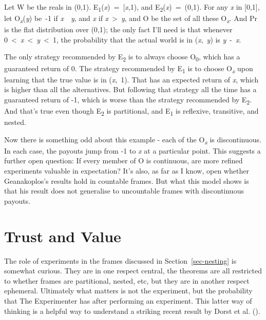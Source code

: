 \documentclass[
  11pt,
  letterpaper,
  DIV=11,
  numbers=noendperiod,
  twoside]{scrartcl}
\begin{document}
Let W be the reals in (0,1).
E\textsubscript{1}(\emph{x})~=~{[}\emph{x},1), and
E\textsubscript{2}(\emph{x})~=~(0,1). For any \emph{x} in {[}0,1{]}, let
O\textsubscript{\emph{x}}(\emph{y}) be~-1 if \emph{x}~\geq~\emph{y}, and
\emph{x} if \emph{x}~\textgreater~\emph{y}, and O be the set of all
these O\textsubscript{\emph{x}}. And Pr is the flat distribution over
(0,1); the only fact I'll need is that whenever
0~\textless~\emph{x}~\textless~\emph{y}~\textless~1, the probability
that the actual world is in (\emph{x},~\emph{y}) is \emph{y}~-~\emph{x}.

The only strategy recommended by E\textsubscript{2} is to always choose
O\textsubscript{0}, which has a guaranteed return of 0. The strategy
recommended by E\textsubscript{1} is to choose O\textsubscript{\emph{x}}
upon learning that the true value is in (\emph{x},~1). That has an
expected return of \emph{x}, which is higher than all the alternatives.
But following that strategy all the time has a guaranteed return of -1,
which is worse than the strategy recommended by E\textsubscript{2}. And
that's true even though E\textsubscript{2} is partitional, and
E\textsubscript{1} is reflexive, transitive, and nested.

Now there is something odd about this example - each of the
O\textsubscript{\emph{x}} is discontinuous. In each case, the payouts
jump from -1 to \emph{x} at a particular point. This suggests a further
open question: If every member of O is continuous, are more refined
experiments valuable in expectation? It's also, as far as I know, open
whether Geanakoplos's results hold in countable frames. But what this
model shows is that his result does not generalise to uncountable frames
with discontinuous payouts.

\section{Trust and Value}\label{sec-dorst}

The role of experiments in the frames discussed in
Section~\ref{sec-nesting} is somewhat curious. They are in one respect
central, the theorems are all restricted to whether frames are
partitional, nested, etc, but they are in another respect ephemeral.
Ultimately what matters is not the experiment, but the probability that
The Experimenter has after performing an experiment. This latter way of
thinking is a helpful way to understand a striking recent result by
Dorst et al. ().
\end{document}
